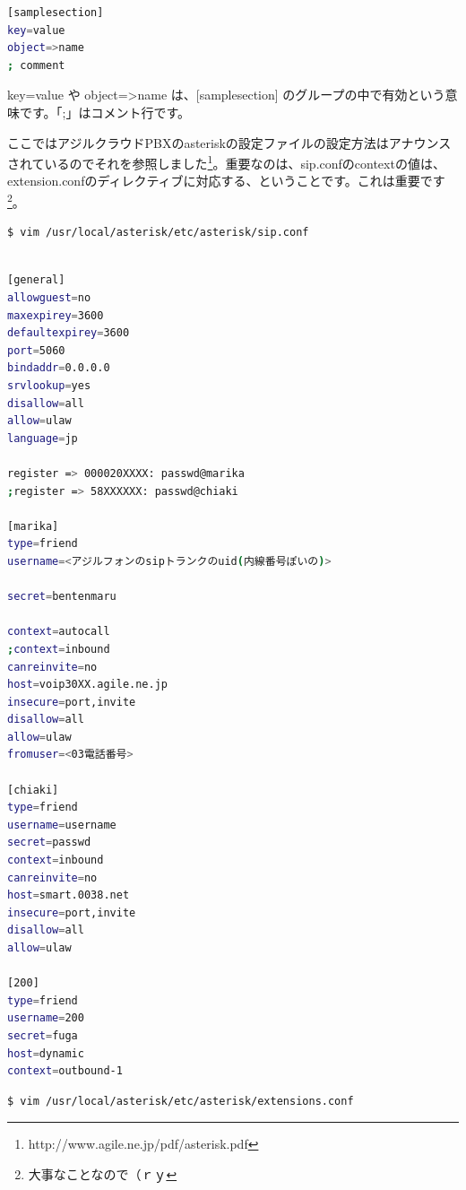 \begin{lstlisting}[language=bash]
[samplesection]
key=value
object=>name
; comment 
\end{lstlisting}

key=value や object=\textgreater name は、[samplesection] のグループの中で有効という意味です。「;」はコメント行です。

ここではアジルクラウドPBXのasteriskの設定ファイルの設定方法はアナウンスされているのでそれを参照しました\footnote{http://www.agile.ne.jp/pdf/asterisk.pdf}。重要なのは、sip.confのcontextの値は、extension.confのディレクティブに対応する、ということです。これは重要です\footnote{大事なことなので（ｒｙ}。

\begin{lstlisting}[language=bash]
$ vim /usr/local/asterisk/etc/asterisk/sip.conf
\end{lstlisting}

\begin{lstlisting}[language=bash]

[general]
allowguest=no
maxexpirey=3600
defaultexpirey=3600
port=5060
bindaddr=0.0.0.0
srvlookup=yes
disallow=all
allow=ulaw
language=jp

register => 000020XXXX: passwd@marika
;register => 58XXXXXX: passwd@chiaki

[marika]
type=friend
username=<アジルフォンのsipトランクのuid(内線番号ぽいの)>

secret=bentenmaru

context=autocall
;context=inbound
canreinvite=no
host=voip30XX.agile.ne.jp
insecure=port,invite
disallow=all
allow=ulaw
fromuser=<03電話番号>

[chiaki]
type=friend
username=username
secret=passwd
context=inbound
canreinvite=no
host=smart.0038.net
insecure=port,invite
disallow=all
allow=ulaw

[200]
type=friend
username=200
secret=fuga
host=dynamic
context=outbound-1
\end{lstlisting}


\begin{lstlisting}[language=bash]
$ vim /usr/local/asterisk/etc/asterisk/extensions.conf
\end{lstlisting}

